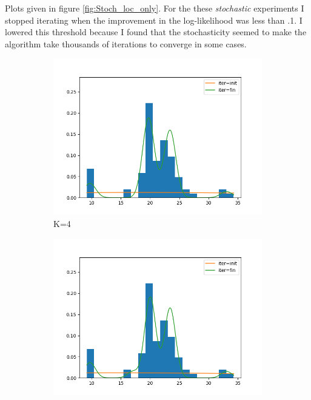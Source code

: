 Plots given in figure \ref{fig:Stoch_loc_only}. 
For the these \textit{stochastic} experiments I stopped iterating when the improvement in the log-likelihood was less than .1.
I lowered this threshold because I found that the stochasticity seemed to make the algorithm take thousands of iterations to converge in some cases.

\begin{figure}
     \centering
     \begin{subfigure}[b]{0.3\textwidth}
         \centering
         \includegraphics[width=\textwidth]{../code/stochastic_loc_only_plots/galaxies_hist_k_4.png}
         \caption{K=4}
         \label{fig:Stoch_loc_only4}
     \end{subfigure}
     \hfill
     \begin{subfigure}[b]{0.3\textwidth}
         \centering
         \includegraphics[width=\textwidth]{../code/stochastic_loc_only_plots/galaxies_hist_k_6.png}

\end{subfigure}
\end{figure}
